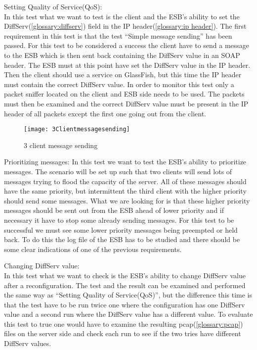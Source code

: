     Setting Quality of Service(QoS):\\
    In this test what we want to test is the client and the ESB’s ability to set the DiffServ(\ref{glossary:diffserv}) field in the IP header(\ref{glossary:ip header}). The first requirement in this test is that the test “Simple message sending” has been passed. For this test to be considered a success the client have to send a message to the ESB which is then sent back containing the DiffServ value in an SOAP header. The ESB must at this point have set the DiffServ value in the IP header. Then the client should use a service on GlassFish, but this time the IP header must contain the correct DiffServ value. In order to monitor this test only a packet sniffer located on the client and ESB side needs to be used. The packets must then be examined and the correct DiffServ value must be present in the IP header of all packets except the first one going out from the client.

    \begin{figure}[h]
        \centering
        \texttt{[image: 3Clientmessagesending]}
        \caption{3 client message sending}
        \label{fig:3 client message sending}
    \end{figure}
    
    Prioritizing messages:
    In this test we want to test the ESB’s ability to prioritize messages. The scenario will be set up such that two clients will send lots of messages trying to flood the capacity of the server. All of these messages should have the same priority, but intermittent the third client with the higher priority should send some messages. What we are looking for is that these higher priority messages should be sent out from the ESB ahead of lower priority and if necessary it have to stop some already sending messages. For this test to be successful we must see some lower priority messages being preempted or held back. To do this the log file of the ESB has to be studied and there should be some clear indications of one of the previous requirements.

    Changing DiffServ value:\\
    In this test what we want to check is the ESB’s ability to change DiffServ value after a reconfiguration. The test and the result can be examined and performed the same way as “Setting Quality of Service(QoS)”, but the difference this time is that the test have to be run twice one where the configuration has one DiffServ value and a second run where the DiffServ value has a different value. To evaluate this test to true one would have to examine the resulting pcap(\ref{glossary:pcap}) files on the server side and check each run to see if the two tries have different DiffServ values.

